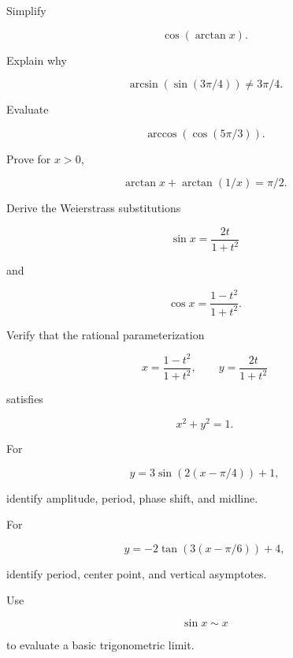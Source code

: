 \begin{exercise}[2]
Simplify

\[
\cos(\arctan x).
\]
\end{exercise}

\begin{exercise}[3]
Explain why

\[
\arcsin(\sin(3\pi/4))
\neq
3\pi/4.
\]
\end{exercise}

\begin{exercise}[3]
Evaluate

\[
\arccos(\cos(5\pi/3)).
\]
\end{exercise}

\begin{exercise}[3]
Prove for \(x>0\),

\[
\arctan x
+
\arctan(1/x)
=
\pi/2.
\]
\end{exercise}

\begin{exercise}[3]
Derive the Weierstrass substitutions

\[
\sin x
=
\frac{2t}{1+t^2}
\]

and

\[
\cos x
=
\frac{1-t^2}{1+t^2}.
\]
\end{exercise}

\begin{exercise}[3]
Verify that the rational parameterization

\[
x
=
\frac{1-t^2}{1+t^2},
\qquad
y
=
\frac{2t}{1+t^2}
\]

satisfies

\[
x^2+y^2=1.
\]
\end{exercise}

\begin{exercise}[2]
For

\[
y=3\sin(2(x-\pi/4))+1,
\]

identify amplitude, period, phase shift, and midline.
\end{exercise}

\begin{exercise}[2]
For

\[
y=-2\tan(3(x-\pi/6))+4,
\]

identify period, center point, and vertical asymptotes.
\end{exercise}

\begin{exercise}[3]
Use

\[
\sin x\sim x
\]

to evaluate a basic trigonometric limit.
\end{exercise}


